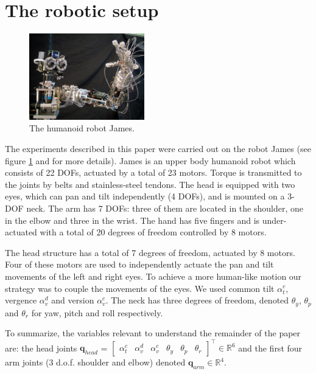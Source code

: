 \section{The robotic setup}
\label{Sec:setup}

\begin{figure}
\centering
\includegraphics[width=5cm]{Figure/James1.eps}
\caption{The humanoid robot James.}
\label{Fig:PicureJames}
\end{figure}

The experiments described in this paper were carried out on the robot 
James (see figure \ref{Fig:PicureJames} and \cite{jamone06james} for 
more details). James is an upper body 
humanoid robot which consists of 22 DOFs, actuated by a total of 
23 motors. Torque is transmitted to the joints by belts and 
stainless-steel tendons. The head is equipped with two eyes, which 
can pan and tilt independently (4 DOFs), and is mounted on a 3-DOF 
neck. The arm has 7 DOFs: three of them are located in the shoulder, 
one in the elbow and three in the wrist. The hand has five fingers 
and is under-actuated with a total of 20 degrees of freedom controlled 
by 8 motors. 

The head structure has a total of 7 degrees of freedom, actuated by 8 
motors. Four of these motors are used to independently actuate the pan 
and tilt movements of the left and right eyes. To achieve a more 
human-like motion our strategy was to couple the movements of the eyes. 
We used common tilt $\alpha_t^c$, vergence $\alpha_v^d$ and 
version $\alpha_v^c$. The neck has three degrees of freedom, 
denoted $\theta_y$, $\theta_p$ and $\theta_r$ for yaw, pitch and roll 
respectively.

To summarize, the variables relevant to understand the remainder of the paper
are: the head joints 
$\mathbf q_{head}$ = $\begin{bmatrix} \alpha_t^c & \alpha_v^d & \alpha_v^c & \theta_y & \theta_p & \theta_r \end{bmatrix}^\top \in \mathbb R^6$ and the first four arm joints (3 d.o.f. shoulder and elbow) denoted $\mathbf q_{arm} \in \mathbb R^4$.
